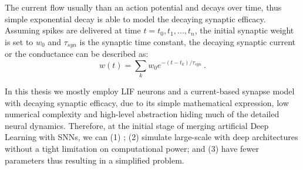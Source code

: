 The current flow usually \DIFdelbegin {}\DIFdelend \DIFaddbegin {}\DIFaddend than an action potential and decays over time, thus \DIFdelbegin {}\DIFdelend \DIFaddbegin {}\DIFaddend simple exponential decay is able to model the decaying synaptic efficacy.
Assuming spikes are delivered at time $t={t_0, t_1, ..., t_n}$, the initial synaptic weight is set to $w_0$ and $\tau_{syn}$ is the synaptic time constant, the decaying synaptic current or the conductance can be described as:
\begin{equation}
w(t) = \sum_k w_0 e^{-(t-t_k)/\tau_{syn}}~.
\end{equation}

In this thesis we mostly employ LIF neurons and a current-based synapse model with decaying synaptic efficacy, due to its simple mathematical expression, low numerical complexity and high-level abstraction hiding much of the detailed neural dynamics.
Therefore, at the initial stage of merging artificial Deep Learning with \DIFdelbegin {}\DIFdelend \DIFaddbegin {}\DIFaddend SNNs, we can (1) \DIFdelbegin {}\DIFdelend \DIFaddbegin {}\DIFaddend ; (2) simulate large-scale \DIFdelbegin {}\DIFdelend \DIFaddbegin {}\DIFaddend with deep architectures without a tight limitation on computational power; and (3) have fewer parameters thus resulting in a simplified problem.


